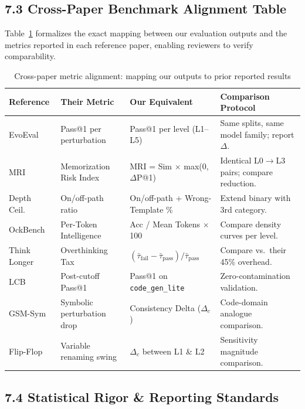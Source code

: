 \documentclass[12pt, a4paper]{article}
\begin{document}
\subsection{7.3 Cross-Paper Benchmark Alignment Table}

Table~\ref{tab:cross_paper} formalizes the exact mapping between our evaluation outputs and the metrics reported in each reference paper, enabling reviewers to verify comparability.

\begin{table}[ht!]
\centering
\caption{Cross-paper metric alignment: mapping our outputs to prior reported results}
\label{tab:cross_paper}
\renewcommand{\arraystretch}{1.2}
{\footnotesize
\begin{tabularx}{\textwidth}{l l X X}
\toprule
\textbf{Reference} & \textbf{Their Metric} & \textbf{Our Equivalent} & \textbf{Comparison Protocol} \\
\midrule
EvoEval~\cite{evoeval} & Pass@1 per perturbation & Pass@1 per level (L1--L5) & Same splits, same model family; report $\Delta$. \\
MRI~\cite{memorize_or_generalize} & Memorization Risk Index & MRI = Sim $\times$ max(0,$\Delta$P@1) & Identical L0$\to$L3 pairs; compare reduction. \\
Depth Ceil.~\cite{depth_ceiling} & On/off-path ratio & On/off-path + Wrong-Template \% & Extend binary with 3rd category. \\
OckBench~\cite{ockbench} & Per-Token Intelligence & Acc / Mean Tokens $\times$ 100 & Compare density curves per level. \\
Think Longer~\cite{thinking_longer} & Overthinking Tax & $(\bar{\tau}_{\text{fail}}{-}\bar{\tau}_{\text{pass}})/\bar{\tau}_{\text{pass}}$ & Compare vs.\ their 45\% overhead. \\
LCB~\cite{livecodebench} & Post-cutoff Pass@1 & Pass@1 on \texttt{code\_gen\_lite} & Zero-contamination validation. \\
GSM-Sym~\cite{gsm_symbolic} & Symbolic perturbation drop & Consistency Delta ($\Delta_c$) & Code-domain analogue comparison. \\
Flip-Flop~\cite{flip_flop_consistency} & Variable renaming swing & $\Delta_c$ between L1 \& L2 & Sensitivity magnitude comparison. \\
\bottomrule
\end{tabularx}
}
\end{table}

\subsection{7.4 Statistical Rigor \& Reporting Standards}
\end{document}
